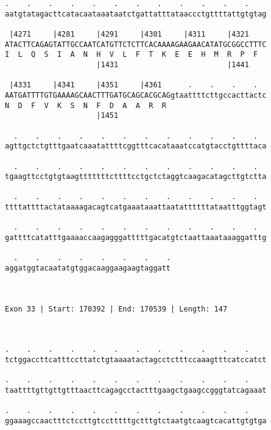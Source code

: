 \documentclass{article}
\begin{document}
\begin{Verbatim}
.    .    .    .    .    .    .    .    .    .    .    .    
aatgtatagacttcatacaataaataatctgattatttataaccctgttttattgtgtag
                                                            
 |4271     |4281     |4291     |4301     |4311     |4321    
ATACTTCAGAGTATTGCCAATCATGTTCTCTTCACAAAAGAAGAACATATGCGGCCTTTC
I  L  Q  S  I  A  N  H  V  L  F  T  K  E  E  H  M  R  P  F  
                     |1431                         |1441    
  
 |4331     |4341     |4351     |4361      .    .    .    .  
AATGATTTTGTGAAAAGCAACTTTGATGCAGCACGCAGgtaattttcttgccacttactc
N  D  F  V  K  S  N  F  D  A  A  R  R                       
                     |1451                                  
  
  .    .    .    .    .    .    .    .    .    .    .    .  
agttgctctgtttgaatcaaatattttcggtttcacataaatccatgtacctgttttaca
                                                            
  .    .    .    .    .    .    .    .    .    .    .    .  
tgaagttcctgtgtaagtttttttcttttcctgctctaggtcaagacatagcttgtctta
                                                            
  .    .    .    .    .    .    .    .    .    .    .    .  
ttttattttactataaaagacagtcatgaaataaattaatattttttataatttggtagt
                                                            
  .    .    .    .    .    .    .    .    .    .    .    .  
gattttcatatttgaaaaccaagagggatttttgacatgtctaattaaataaaggatttg
                                                            
  .    .    .    .    .    .    .    .
aggatggtacaatatgtggacaaggaagaagtaggatt
                                      
                                      
 
Exon 33 | Start: 170392 | End: 170539 | Length: 147



.    .    .    .    .    .    .    .    .    .    .    .    
tctggaccttcatttccttatctgtaaaatactagcctctttccaaagtttcatccatct
                                                            
.    .    .    .    .    .    .    .    .    .    .    .    
taattttgttgttgtttaacttcagagcctactttgaagctgaagccgggtatcagaaat
                                                            
.    .    .    .    .    .    .    .    .    .    .    .    
ggaaagccaactttctccttgtcctttttgctttgtctaatgtcaagtcacattgtgtga
                                                            

\end{Verbatim}
\end{document}
